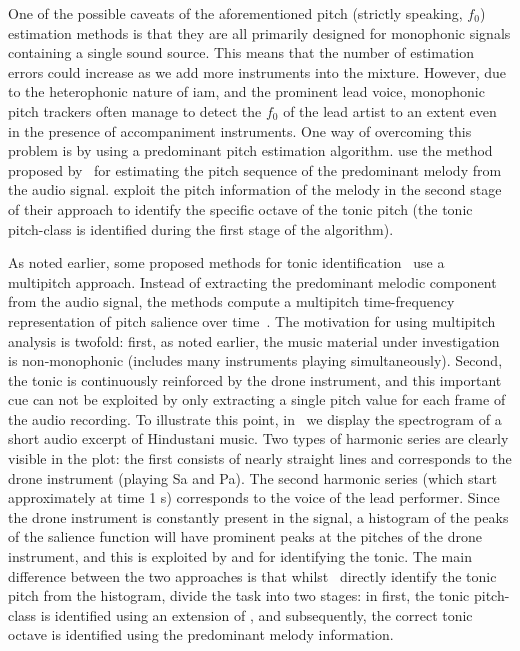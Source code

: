 One of the possible caveats of the aforementioned pitch (strictly speaking, $f_0$) estimation methods is that they are all primarily designed for monophonic signals containing a single sound source. This means that the number of estimation errors could increase as we add more instruments into the mixture. However, due to the heterophonic nature of \gls{iam}, and the prominent lead voice, monophonic pitch trackers often manage to detect the $f_0$ of the lead artist to an extent even in the presence of accompaniment instruments. One way of overcoming this problem is by using a predominant pitch estimation algorithm. \cite{gulati2012two} use the method proposed by~\cite{Salamon2012} for estimating the pitch sequence of the predominant melody from the audio signal. \cite{gulati2012two} exploit the pitch information of the melody in the second stage of their approach to identify the specific octave of the tonic pitch (the tonic pitch-class is identified during the first stage of the algorithm).

As noted earlier, some proposed methods for tonic identification~\citep{salamon2012multipitch,gulati2012two} use a multipitch approach. Instead of extracting the predominant melodic component from the audio signal, the methods compute a multipitch time-frequency representation of pitch salience over time~\citep{Salamon2011}. The motivation for using multipitch analysis is twofold: first, as noted earlier, the music material under investigation is non-monophonic (includes many instruments playing simultaneously). Second, the tonic is continuously reinforced by the drone instrument, and this important cue can not be exploited by only extracting a single pitch value for each frame of the audio recording. To illustrate this point, in~ we display the spectrogram of a short audio excerpt of Hindustani music. Two types of harmonic series are clearly visible in the plot: the first consists of nearly straight lines and corresponds to the drone instrument (playing Sa and Pa). The second harmonic series (which start approximately at time 1 s) corresponds to the voice of the lead performer. Since the drone instrument is constantly present in the signal, a histogram of the peaks of the salience function will have prominent peaks at the pitches of the drone instrument, and this is exploited by \cite{salamon2012multipitch} and \cite{gulati2012two} for identifying the tonic. The main difference between the two approaches is that whilst~\cite{salamon2012multipitch} directly identify the tonic pitch from the histogram, \cite{gulati2012two} divide the task into two stages: in first, the tonic pitch-class is identified using an extension of \cite{salamon2012multipitch}, and subsequently, the correct tonic octave is identified using the predominant melody information.

